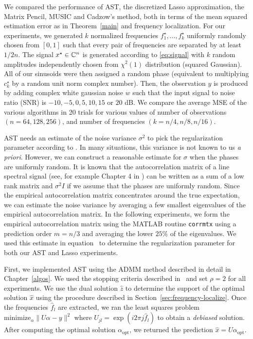 
We compared the performance of AST, the discretized Lasso approximation, the
Matrix Pencil, MUSIC and Cadzow's method, both in terms of the mean squared
estimation error as in Theorem~\ref{main} and frequency localization. For our
experiments, we generated $k$ normalized frequencies $f_1^\star, \ldots,
f_k^\star$ uniformly randomly chosen from $\left[0,1\right]$ such that every
pair of frequencies are separated by at least $1/2n$. The signal $x^\star \in
\mathbb{C}^n$ is generated according to \eqref{eq:signal} with $k$ random amplitudes
independently chosen from $\chi^2(1)$ distribution (squared Gaussian). All of
our sinusoids were then assigned a random phase (equivalent to multiplying
$c_k^\star$ by a random unit norm complex number). Then, the observation $y$ is
produced by adding complex white gaussian noise $w$ such that the input signal
to noise ratio (SNR) is $-10,-5,0,5,10,15$ or $20$ dB. We compare the average
MSE of the various algorithms in 20 trials for various values of number of
observations $(n = 64,128,256)$, and number of frequencies $ (k =
n/4,n/8,n/16)$.


AST needs an estimate of the noise variance $\sigma^2$ to pick the
regularization parameter according to . In many situations, this
variance is not known to us \emph{a priori}. However, we can construct a
reasonable estimate for $\sigma$ when the phases are uniformly random. It is
known that the autocorrelation matrix of a line spectral signal (see, for
example Chapter 4 in \cite{StoicaMoses}) can be written as a sum of a low rank
matrix and $\sigma^2 I$ if we assume that the phases are uniformly random. Since
the empirical autocorrelation matrix concentrates around the true expectation,
we can estimate the noise variance by averaging a few smallest eigenvalues of
the empirical autocorrelation matrix. In the following experiments, we form the
empirical autocorrelation matrix using the MATLAB routine \texttt{corrmtx} using
a prediction order $m=n/3$ and averaging the lower $25\%$ of the eigenvalues. We
used this estimate in equation~ to determine the regularization
parameter for both our AST and Lasso experiments.

First, we implemented AST using the ADMM method described in detail in
Chapter~\ref{algos}. We used the stopping criteria described in~\cite{admm2011}
and set $\rho=2$ for all experiments. We use the dual solution $\hat{z}$ to
determine the support of the optimal solution $\hat{x}$ using the procedure
described in Section~\ref{sec:frequency-localize}. Once the frequencies
$\hat{f}_l$ are extracted, we ran the least squares problem
$\mbox{minimize}_\alpha \|U \alpha - y\|^2$ where $U_{jl} = \exp(i 2\pi j
\hat{f}_l)$ to obtain a \emph{debiased} solution. After computing the optimal
solution $\alpha_{\mathrm{opt}}$, we returned the prediction $\hat{x} =
U\alpha_{\mathrm{opt}}$.


